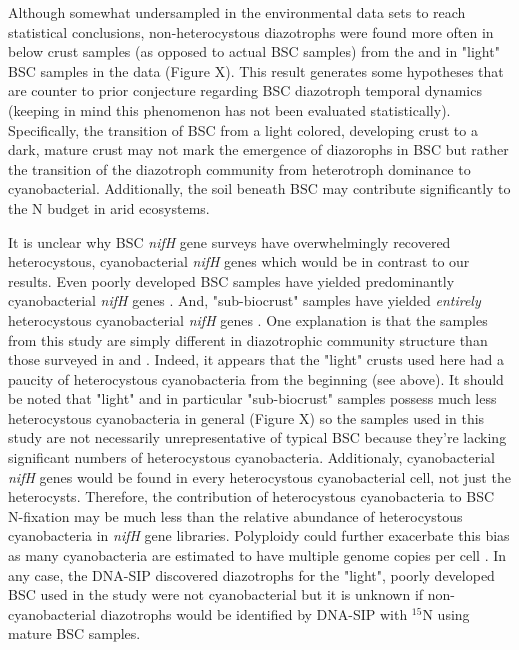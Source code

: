 Although somewhat undersampled in the environmental data sets to reach statistical conclusions, non-heterocystous diazotrophs were found more often in below crust samples (as opposed to actual BSC samples) from the \citet{Steven_2013} and in "light" BSC samples in the \citet{Garcia_Pichel_2013} data (Figure X). This result generates some hypotheses that are counter to prior conjecture regarding BSC diazotroph temporal dynamics (keeping in mind this phenomenon has not been evaluated statistically). Specifically, the transition of BSC from a light colored, developing crust to a dark, mature crust may not mark the emergence of diazorophs in BSC but rather the transition of the diazotroph community from heterotroph dominance to cyanobacterial. Additionally, the soil beneath BSC may contribute significantly to the N budget in arid ecosystems.

It is unclear why BSC \textit{nifH} gene surveys have overwhelmingly recovered heterocystous, cyanobacterial \textit{nifH} genes which would be in contrast to our results. Even poorly developed BSC samples have yielded predominantly cyanobacterial \textit{nifH} genes \cite{14766579}. And, "sub-biocrust" samples have yielded \textit{entirely} heterocystous cyanobacterial \textit{nifH} genes \cite{Yeager_2012}. One explanation is that the samples from this study are simply different in diazotrophic community structure than those surveyed in \citet{Yeager} \citet{14766579} and \citet{Yeager_2012}. Indeed, it appears that the "light" crusts used here had a paucity of heterocystous cyanobacteria from the beginning (see above). It should be noted that "light" and in particular "sub-biocrust" samples possess much less heterocystous cyanobacteria in general (Figure X) so the samples used in this study are not necessarily unrepresentative of typical BSC because they're lacking significant numbers of heterocystous cyanobacteria. Additionaly, cyanobacterial \textit{nifH} genes would be found in every heterocystous cyanobacterial cell, not just the heterocysts. Therefore, the contribution of heterocystous cyanobacteria to BSC N-fixation may be much less than the relative abundance of heterocystous cyanobacteria in \textit{nifH} gene libraries. Polyploidy could further exacerbate this bias as many cyanobacteria are estimated to have multiple genome copies per cell \cite{Griese_2011}. In any case, the DNA-SIP discovered diazotrophs for the "light", poorly developed BSC used in the study were not cyanobacterial but it is unknown if non-cyanobacterial diazotrophs would be identified by DNA-SIP with $^{15}$N using mature BSC samples. 


